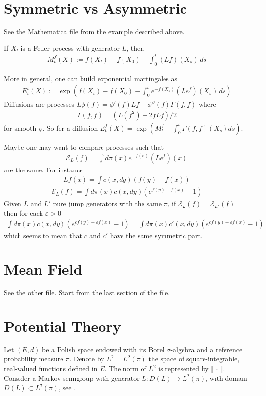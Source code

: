 \documentclass[reqno]{amsart}
\newcounter{as}[section]
\newcommand{\mc}[1]{{\mathcal #1}}
\newcommand{\<}{\langle}
\renewcommand{\>}{\rangle}
\newcommand{\bel}[2]{\begin{equation} \label{#1} \begin{split} #2
 					\end{split} \end{equation}}
\begin{document}
\newpage
\section{Symmetric vs Asymmetric}
See the Mathematica file from the example described above.


If $X_t$ is a Feller process with generator $L$, then
\bel{e:fa}{
M_t^f(X):=f(X_t)-f(X_0)-\int_0^t (Lf)(X_s)\,ds
}

More in general, one can build exponential martingales as
\bel{e:fa}{
E_t^t(X):=\exp(f(X_t)-f(X_0)-\int_0^t e^{-f(X_s)}(L e^f)(X_s)\,ds)
}
Diffusions are processes $L\phi(f)=\phi'(f) Lf+ \phi''(f) \Gamma(f,f)$ where \bel{e:gamma}{
\Gamma(f,f)= (L(f^2)-2 f Lf)/2
}
for smooth $\phi$. So for a diffusion $E^f_t(X)=\exp(M_t^f - \int_0^t \Gamma(f,f)(X_s)ds)$.

Maybe one may want to compare processes such that
\bel{e:comp}{
\mc E_L(f)=\int d\pi(x) e^{-f(x)} (Le^f)(x)
}
are the same. For instance
\bel{e:fa}{
Lf(x)=\int c(x,dy)(f(y)-f(x))
}
\bel{e:comp2}{
	\mc E_L(f)=\int d\pi(x) c(x,dy) (e^{f(y)-f(x)}-1)
}
Given $L$ and $L'$ pure jump generators with the same $\pi$, 
if $\mc E_L(f)=\mc E_{L'}(f)$ then for each $\varepsilon>0$
\bel{e:comp3}{
\int d\pi(x) c(x,dy) (e^{\varepsilon f(y)-\varepsilon f(x)}-1)=\int d\pi(x) c'(x,dy) (e^{\varepsilon f(y)-\varepsilon f(x)}-1)
}
which seems to mean that $c$ and $c'$ have the same symmetric part.




\newpage
\section{Mean Field}

See the other file. Start from the last section of the file.









\section{Potential Theory}


Let $(E,d)$ be a Polish space endowed with its Borel $\sigma$-algebra and a reference probability measure $\pi$. Denote by $L^2 = L^2(\pi)$ the space of square-integrable, real-valued functions defined in $E$. The norm of $L^2$ is represented by $\Vert\,\cdot\,\Vert$. Consider a Markov semigroup with generator $L \colon D(L) \to L^2(\pi)$, with domain $D(L) \subset L^2(\pi)$, see \cite[Definition~1.8]{MR92}.
\end{document}
